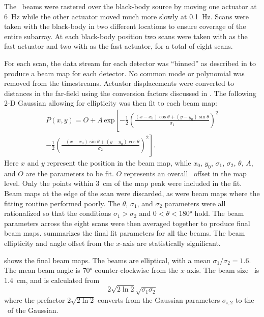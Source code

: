 The \Imager\ beams were rastered over the black-body source by moving one actuator at \SI{6}{\hertz} while the other actuator moved much more slowly at \SI{0.1}{\hertz}.
Scans were taken with the black-body in two different locations to ensure coverage of the entire subarray.
At each black-body position two scans were taken with  as the fast actuator and two with  as the fast actuator, for a total of eight scans.

For each scan, the data stream for each detector was ``binned'' as described in  to produce a beam map for each detector.
No common mode or polynomial was removed from the timestreams.
Actuator displacements were converted to distances in the far-field using the conversion factors discussed in .
The following 2-D Gaussian allowing for ellipticity was then fit to each beam map:
\begin{multline}
  P(x,y) = O + A \, \text{exp} \left[  - \frac{1}{2} \left( \frac{ (x-x_0) \cos{\theta} + (y-y_0) \sin{\theta}}{\sigma_1} \right)^2 \right. \\ 
                              \left. - \frac{1}{2} \left( \frac{-(x-x_0) \sin{\theta} + (y-y_0) \cos{\theta}}{\sigma_2} \right)^2
                       \right] .
\end{multline}
Here $x$ and $y$ represent the position in the beam map, while $x_0$, $y_0$, $\sigma_1$, $\sigma_2$, $\theta$, $A$, and $O$ are the parameters to be fit.
$O$ represents an overall \DC\ offset in the map level.
Only the points within \SI{3}{\cm} of the map peak were included in the fit.
Beam maps at the edge of the scan were discarded, as were beam maps where the fitting routine performed poorly. %
The $\theta$, $\sigma_1$, and $\sigma_2$ parameters were all rationalized so that the conditions $\sigma_1 > \sigma_2$ and $0 < \theta < \ang{180}$ hold.
The beam parameters across the eight scans were then averaged together to produce final beam maps.
 summarizes the final fit parameters for all the beams.
The beam ellipticity and angle offset from the $x$-axis are statistically significant.

 shows the final beam maps.
The beams are elliptical, with a mean $\sigma_1 / \sigma_2 = 1.6$.
The mean beam angle is $\ang{70}$ counter-clockwise from the $x$-axis.
The beam size \FWHM\ is \SI{1.4}{\cm}, and is calculated from
\begin{equation}
  2 \sqrt{2 \ln{2}} \sqrt{\sigma_1 \sigma_2}
\end{equation}
where the prefactor $2 \sqrt{2 \ln{2}}$ converts from the Gaussian parameters $\sigma_{i,2}$ to the \FWHM\ of the Gaussian.

